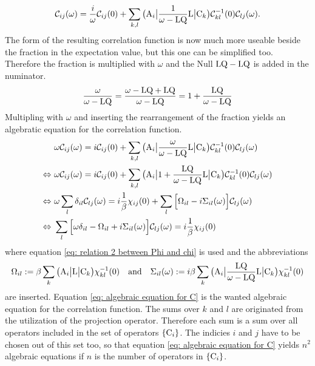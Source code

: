 %
\begin{align}
	\mathcal{C}_{ij}(\omega) = \frac{i}{\omega} \mathcal{C}_{ij}(0) + \sum\limits_{k,l} \big({\mathrm{A}_{i}}\big| \frac{1}{\omega - \mathrm{LQ}} \mathrm{L} \big|{\mathrm{C}_{k}}\big) \mathcal{C}_{kl}^{-1}(0) \mathcal{C}_{lj}(\omega).
\end{align}
%
The form of the resulting correlation function is now much more useable beside the fraction in the expectation value, but this one can be simplified too.
Therefore the fraction is multiplied with $\omega$ and the Null $\mathrm{LQ} - \mathrm{LQ}$ is added in the numinator.
%
\begin{align}
	\frac{\omega}{\omega - \mathrm{LQ}} = \frac{\omega - \mathrm{LQ} + \mathrm{LQ}}{\omega - \mathrm{LQ}} = 1 + \frac{\mathrm{LQ}}{\omega - \mathrm{LQ}}
\end{align}
%
Multipling with $\omega$ and inserting the rearrangement of the fraction yields an algebratic equation for the correlation function.
%
\begin{align}
	&\omega \mathcal{C}_{ij}(\omega) = i \mathcal{C}_{ij}(0) + \sum\limits_{k,l} \big({\mathrm{A}_{i}}\big| \frac{\omega}{\omega - \mathrm{LQ}} \mathrm{L} \big|{\mathrm{C}_{k}}\big) \mathcal{C}_{kl}^{-1}(0) \mathcal{C}_{lj}(\omega)
	\notag \\
	\Leftrightarrow\ &\omega \mathcal{C}_{ij}(\omega) = i \mathcal{C}_{ij}(0) + \sum\limits_{k,l} \big({\mathrm{A}_{i}}\big| 1 + \frac{\mathrm{LQ}}{\omega - \mathrm{LQ}} \mathrm{L} \big|{\mathrm{C}_{k}}\big) \mathcal{C}_{kl}^{-1}(0) \mathcal{C}_{lj}(\omega)
	\notag \\
	\Leftrightarrow\ &\omega \sum\limits_{l} \delta_{il} \mathcal{C}_{lj}(\omega) = i \frac{1}{\beta} \chi_{ij}(0) + \sum\limits_{l} \Big[\Omega_{il} -i \Sigma_{il}(\omega)\Big]  \mathcal{C}_{lj}(\omega)
	\notag \\
	\Leftrightarrow\ &\sum\limits_{l} \Big[\omega \delta_{il} - \Omega_{il} + i \Sigma_{il}(\omega)\Big] \mathcal{C}_{lj}(\omega) = i \frac{1}{\beta} \chi_{ij}(0)
	\label{eq: algebraic equation for C}
\end{align}
%
where equation \eqref{eq: relation 2 between Phi and chi} is used and the abbreviations
%
\begin{align}
	\Omega_{il} := \beta \sum\limits_{k} \obra{\mt{A}_{i}} \mt{L} \oket{\mt{C}_{k}} \chi_{kl}^{-1}(0)
	\qq{and}
	\Sigma_{il}(\omega) := i \beta \sum\limits_{k} \obra{\mt{A}_{i}} \frac{\mt{LQ}}{\omega - \mt{LQ}} \mt{L} \oket{\mt{C}_{k}} \chi_{kl}^{-1}(0)
\end{align}
%
are inserted.
Equation \eqref{eq: algebraic equation for C} is the wanted algebraic equation for the correlation function.
The sums over $k$ and $l$ are originated from the utilization of the projection operator.
Therefore each sum is a sum over all operators included in the set of operators $\{\mathrm{C}_{i}\}$.
The indicies $i$ and $j$ have to be chosen out of this set too, so that equation \eqref{eq: algebraic equation for C} yields $n^{2}$ algebraic equations if $n$ is the number of operators in $\{\mathrm{C}_{i}\}$.

